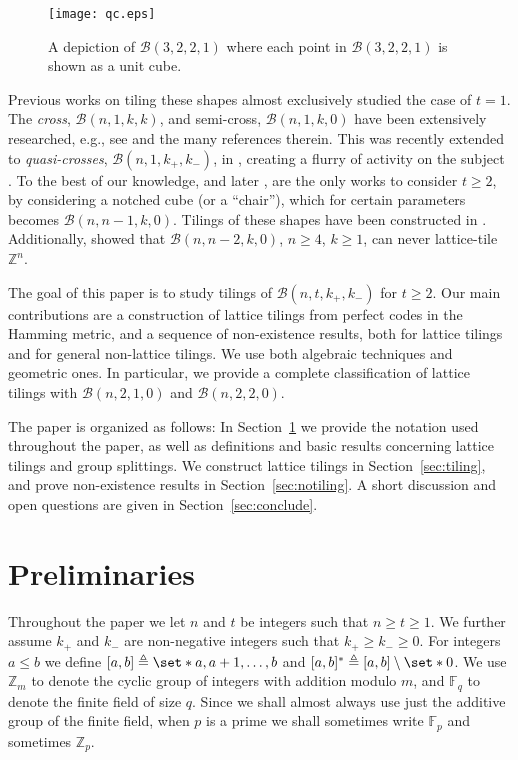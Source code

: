 \documentclass[sort&compress]{elsarticle}
\newcommand{\cB}{\mathcal{B}}
\renewcommand{\leq}{\leqslant}
\renewcommand{\geq}{\geqslant}
\newcommand{\F}{\mathbb{F}}
\newcommand{\Z}{\mathbb{Z}}
\newcommand{\kp}{k_+}
\newcommand{\km}{k_-}
\newcommand{\BALL}{{\mathcal B}(n,t,\kp,\km)}
\newcommand{\eqdef}{\triangleq}
\begin{document}
\begin{figure}
  \begin{center}
    \texttt{[image: qc.eps]}
  \end{center}
  \caption{A depiction of $\cB(3,2,2,1)$ where each point in
    $\cB(3,2,2,1)$ is shown as a unit cube.}
  \label{fig:qc}
\end{figure}

Previous works on tiling these shapes almost exclusively studied the
case of $t=1$. The \emph{cross}, $\cB(n,1,k,k)$, and semi-cross,
$\cB(n,1,k,0)$ have been extensively researched, e.g., see
\cite{Ste84,HamSte84,HicSte86,SteSza94,KloLuoNayYar11} and the many
references therein. This was recently extended to
\emph{quasi-crosses}, $\cB(n,1,\kp,\km)$, in \cite{Sch12}, creating a
flurry of activity on the subject
\cite{YarKloBos13,Sch14,ZhaGe16,ZhaZhaGe17,ZhaGe18,YeZhaZhaGe20}. To
the best of our knowledge, \cite{Ste90} and later \cite{BuzEtz12}, are
the only works to consider $t\geq 2$, by considering a notched cube
(or a ``chair''), which for certain parameters becomes
$\cB(n,n-1,k,0)$. Tilings of these shapes have been constructed in
\cite{Ste90,BuzEtz12}. Additionally, \cite{BuzEtz12} showed that
$\cB(n,n-2,k,0)$, $n\geq 4$, $k\geq 1$, can never lattice-tile $\Z^n$.

The goal of this paper is to study tilings of $\BALL$ for $t\geq
2$. Our main contributions are a construction of lattice tilings from
perfect codes in the Hamming metric, and a sequence of non-existence
results, both for lattice tilings and for general non-lattice
tilings. We use both algebraic techniques and geometric ones. In
particular, we provide a complete classification of lattice tilings
with $\cB(n,2,1,0)$ and $\cB(n,2,2,0)$.

The paper is organized as follows: In Section~\ref{sec:prelim} we
provide the notation used throughout the paper, as well as definitions
and basic results concerning lattice tilings and group splittings. We
construct lattice tilings in Section~\ref{sec:tiling}, and prove
non-existence results in Section~\ref{sec:notiling}. A short
discussion and open questions are given in Section~\ref{sec:conclude}.

\section{Preliminaries}
\label{sec:prelim}

Throughout the paper we let $n$ and $t$ be integers such that $n\geq
t\geq 1$. We further assume $\kp$ and $\km$ are non-negative integers
such that $\kp\geq \km\geq 0$. For integers $a\leq b$ we define
$[a,b]\eqdef\set*{a,a+1,\dots,b}$ and $[a,b]^*\eqdef
[a,b]\setminus\set*{0}$. We use $\Z_m$ to denote the cyclic group of
integers with addition modulo $m$, and $\F_q$ to denote the finite
field of size $q$. Since we shall almost always use just the additive
group of the finite field, when $p$ is a prime we shall sometimes
write $\F_p$ and sometimes $\Z_p$.
\end{document}
